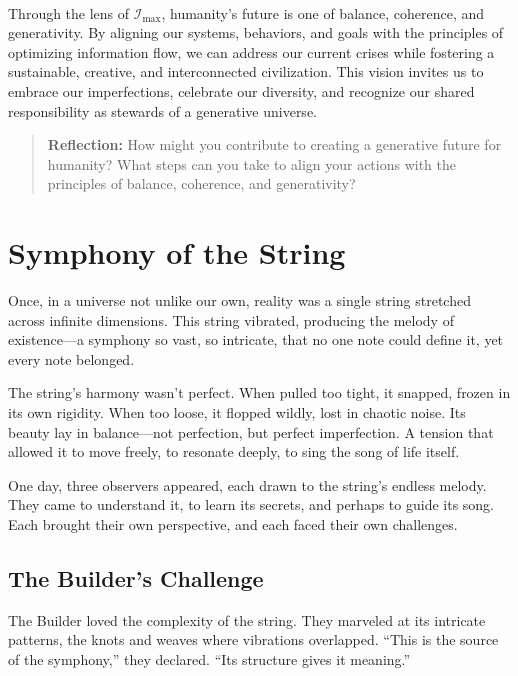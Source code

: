 \documentclass[12pt]{article}
\begin{document}
\paragraph{}
Through the lens of \(\mathcal{I}_{\text{max}}\), humanity’s future is one of balance, coherence, and generativity. By aligning our systems, behaviors, and goals with the principles of optimizing information flow, we can address our current crises while fostering a sustainable, creative, and interconnected civilization. This vision invites us to embrace our imperfections, celebrate our diversity, and recognize our shared responsibility as stewards of a generative universe.

\begin{quote}
\textbf{Reflection:}  
How might you contribute to creating a generative future for humanity? What steps can you take to align your actions with the principles of balance, coherence, and generativity?
\end{quote}


\section{Symphony of the String}

Once, in a universe not unlike our own, reality was a single string stretched across infinite dimensions. This string vibrated, producing the melody of existence---a symphony so vast, so intricate, that no one note could define it, yet every note belonged.

The string’s harmony wasn’t perfect. When pulled too tight, it snapped, frozen in its own rigidity. When too loose, it flopped wildly, lost in chaotic noise. Its beauty lay in balance---not perfection, but perfect imperfection. A tension that allowed it to move freely, to resonate deeply, to sing the song of life itself.

One day, three observers appeared, each drawn to the string’s endless melody. They came to understand it, to learn its secrets, and perhaps to guide its song. Each brought their own perspective, and each faced their own challenges.

\subsection*{The Builder’s Challenge}
The Builder loved the complexity of the string. They marveled at its intricate patterns, the knots and weaves where vibrations overlapped. “This is the source of the symphony,” they declared. “Its structure gives it meaning.”
\end{document}
